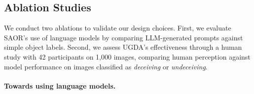 
\subsection{Ablation Studies}

We conduct two ablations to validate our design choices. First, we evaluate SAOR's use of language models by comparing LLM-generated prompts against simple object labels. Second, we assess UGDA's effectiveness through a human study with 42 participants on 1,000 images, comparing human perception against model performance on images classified as \textit{deceiving} or \textit{undeceiving}.
\vspace{-14pt} 
\paragraph{Towards using language models.} 

